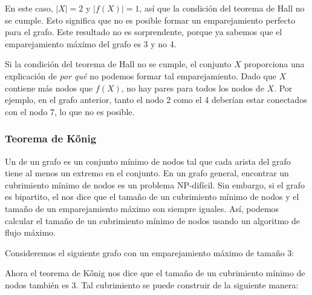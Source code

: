 En este caso, $|X|=2$ y $|f(X)|=1$,
así que la condición del teorema de Hall no se cumple.
Esto significa que no es posible formar
un emparejamiento perfecto para el grafo.
Este resultado no es sorprendente, porque ya
sabemos que el emparejamiento máximo del grafo es 3 y no 4.

Si la condición del teorema de Hall no se cumple,
el conjunto $X$ proporciona una explicación de \emph{por qué}
no podemos formar tal emparejamiento.
Dado que $X$ contiene más nodos que $f(X)$,
no hay pares para todos los nodos de $X$.
Por ejemplo, en el grafo anterior, tanto el nodo 2 como el 4
deberían estar conectados con el nodo 7, lo que no es posible.

\subsubsection{Teorema de Kőnig}


Un  de un grafo
es un conjunto mínimo de nodos tal que cada arista del grafo
tiene al menos un extremo en el conjunto.
En un grafo general, encontrar un cubrimiento mínimo de nodos
es un problema NP-difícil.
Sin embargo, si el grafo es bipartito,
el  nos dice que
el tamaño de un cubrimiento mínimo de nodos
y el tamaño de un emparejamiento máximo son siempre iguales.
Así, podemos calcular el tamaño de un cubrimiento mínimo de nodos
usando un algoritmo de flujo máximo.

Consideremos el siguiente grafo
con un emparejamiento máximo de tamaño 3:
\begin{center}
\end{center}
Ahora el teorema de Kőnig nos dice que el tamaño
de un cubrimiento mínimo de nodos también es 3.
Tal cubrimiento se puede construir de la siguiente manera:

